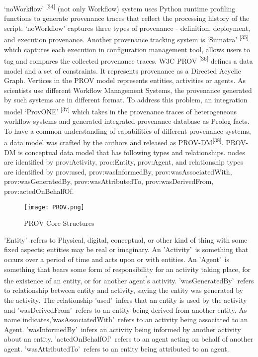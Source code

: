 \documentclass[6pt,,a4paper]{article}
\begin{document}
‘noWorkflow’ \textsuperscript{[34]} (not only Workflow) system uses Python runtime profiling functions to generate provenance traces that reflect the processing history of the script. ‘noWorkflow’ captures three types of provenance - definition, deployment, and execution provenance. 
Another provenance tracking system is ‘Sumatra’ \textsuperscript{[35]}  which captures each execution in configuration management tool, allows users to tag and compares the collected provenance traces. 
W3C PROV \textsuperscript{[36]} defines a data model and a set of constraints. It represents provenance as a Directed Acyclic Graph. Vertices in the PROV model represents entities, activities or agents.  As scientists use different Workflow Management Systems, the provenance generated by such systems are in different format. To address this problem, an integration model ‘ProvONE’ \textsuperscript{[37]} which takes in the provenance traces of heterogeneous workflow systems and generated integrated provenance database as Prolog facts. To have a common understanding of capabilities of different provenance systems, a data model was crafted by the authors and released as PROV-DM\textsuperscript{[38]}. 
PROV-DM is conceptual data model that has following types and relationships. nodes are identified by prov:Activity, proc:Entity, prov:Agent, and relationship types are identified by prov:used, prov:wasInformedBy, prov:wasAssociatedWith, prov:wasGeneratedBy, prov:wasAttributedTo, prov:wasDerivedFrom, prov:actedOnBehalfOf.
\begin{figure}[h]
\begin{center}
            \texttt{[image: PROV.png]}
\end{center}
\centering
\caption{ PROV Core Structures}
\end{figure}
\newline
 'Entity'\, refers to Physical,  digital, conceptual, or other kind of thing with some fixed aspects; entities may be real or imaginary.  An 'Activity'\, is something that occurs over a period of time and acts upon or with entities. An 'Agent'\, is something that bears some form of responsibility for an activity taking place, for the existence of an entity, or for another agent\textsuperscript{'}s activity. 'wasGeneratedBy'\, refers to relationship between entity and activity, saying the entity was generated by the activity. The relationship 'used'\, infers that an entity is used by the activity and 'wasDerivedFrom'\, refers to an entity being derived from another entity. As name indicates,'wasAssociatedWith'\, refers to an activity being associated to an Agent. 'wasInformedBy'\, infers an activity being informed by another activity about an entity. 'actedOnBehalfOf'\, refers to an agent acting on behalf of another agent. 'wasAttributedTo'\, refers to an entity being attributed to an agent.
\end{document}
